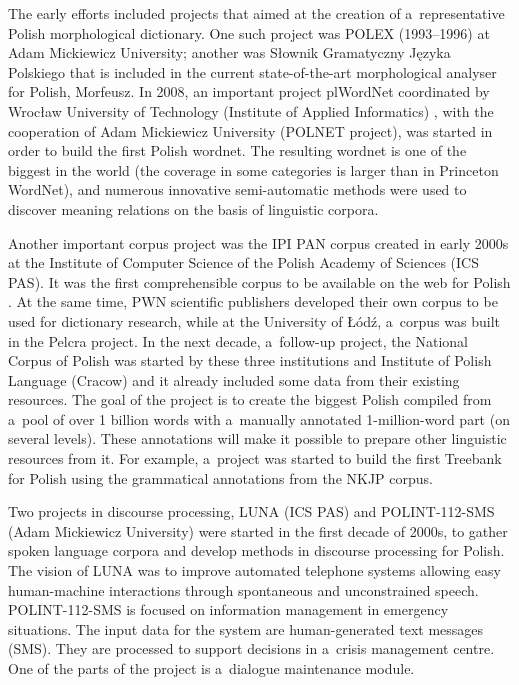 \begin{multicols}{2}
The early efforts included projects that aimed at the creation of
a~representative Polish morphological dictionary. One such project was
POLEX (1993--1996) at Adam Mickiewicz University; another was Słownik
Gramatyczny Języka Polskiego \cite{SGJP} that is included in the
current state-of-the-art morphological analyser for Polish, Morfeusz.
In 2008, an important project plWordNet coordinated by Wrocław
University of Technology (Institute of Applied Informatics)
\cite{Piasecki2009, Slowosiec1}, with the cooperation of Adam
Mickiewicz University (POLNET project), was started in order to build
the first Polish wordnet. The resulting wordnet is one of the biggest
in the world (the coverage in some categories is larger than in
Princeton WordNet), and numerous innovative semi-automatic methods
were used to discover meaning relations on the basis of linguistic
corpora. 

Another important corpus project was the IPI PAN corpus created in
early 2000s at the Institute of Computer Science of the Polish
Academy of Sciences (ICS PAS). It was the first comprehensible corpus
to be available on the web for Polish \cite{korpus1}. At the same
time, PWN scientific publishers developed their own corpus to be used
for dictionary research, while at the University of Łódź, a~corpus
was built in the Pelcra project. In the next decade, a~follow-up
project, the National Corpus of Polish \cite{nkjp1} was started by
these three institutions and Institute of Polish Language (Cracow) and
it already included some data from their existing resources. The goal
of the project is to create the biggest Polish compiled from a~pool of
over 1 billion words with a~manually annotated 1-million-word part (on
several levels). These annotations will make it possible to prepare
other linguistic resources from it. For example, a~project was started
to build the first Treebank for Polish using the grammatical
annotations from the NKJP corpus. 

Two projects in discourse processing, LUNA (ICS PAS) and
POLINT-112-SMS (Adam Mickiewicz University) were started in the first
decade of 2000s, to gather spoken language corpora and develop
methods in discourse processing for Polish. The vision of LUNA was to
improve automated telephone systems allowing easy human-machine
interactions through spontaneous and unconstrained speech.
POLINT-112-SMS is focused on information management in emergency
situations. The input data for the system are human-generated text
messages (SMS). They are processed to support decisions in a~crisis
management centre. One of the parts of the project is a~dialogue
maintenance module. 


\end{multicols}
